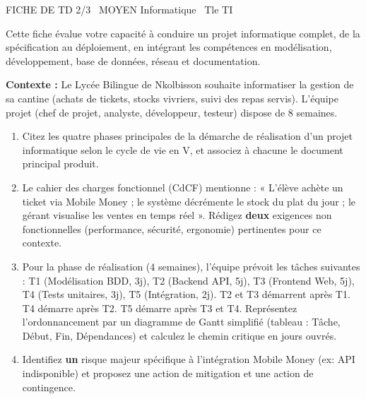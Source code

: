 \documentclass[11pt]{article}
\begin{document}
\begin{tcolorbox}[enhanced,colback=popink,colframe=popink,arc=10pt,boxrule=0pt,left=12pt,right=12pt,top=9pt,bottom=9pt]
{\color{white}\popxbold\small FICHE DE TD 2/3 \textbullet\ MOYEN \hfill Informatique \textbullet\ Tle TI\par}
\end{tcolorbox}
\vspace{4pt}
Cette fiche évalue votre capacité à conduire un projet informatique complet, de la spécification au déploiement, en intégrant les compétences en modélisation, développement, base de données, réseau et documentation.

\begin{exercice}
\textbf{Contexte :} Le Lycée Bilingue de Nkolbisson souhaite informatiser la gestion de sa cantine (achats de tickets, stocks vivriers, suivi des repas servis). L'équipe projet (chef de projet, analyste, développeur, testeur) dispose de 8 semaines.
\begin{enumerate}
    \item Citez les quatre phases principales de la démarche de réalisation d'un projet informatique selon le cycle de vie en V, et associez à chacune le document principal produit.
    \item Le cahier des charges fonctionnel (CdCF) mentionne : « L'élève achète un ticket via Mobile Money ; le système décrémente le stock du plat du jour ; le gérant visualise les ventes en temps réel ». Rédigez \textbf{deux} exigences non fonctionnelles (performance, sécurité, ergonomie) pertinentes pour ce contexte.
    \item Pour la phase de réalisation (4 semaines), l'équipe prévoit les tâches suivantes : T1 (Modélisation BDD, 3j), T2 (Backend API, 5j), T3 (Frontend Web, 5j), T4 (Tests unitaires, 3j), T5 (Intégration, 2j). T2 et T3 démarrent après T1. T4 démarre après T2. T5 démarre après T3 et T4. Représentez l'ordonnancement par un diagramme de Gantt simplifié (tableau : Tâche, Début, Fin, Dépendances) et calculez le chemin critique en jours ouvrés.
    \item Identifiez \textbf{un} risque majeur spécifique à l'intégration Mobile Money (ex: API indisponible) et proposez une action de mitigation et une action de contingence.
\end{enumerate}
\end{exercice}
\end{document}
